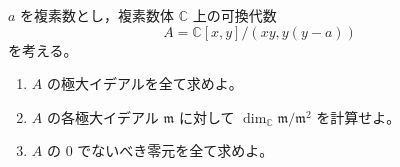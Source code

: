 \newcommand{\C}{\mathbb{C}}
\newcommand{\R}{\mathbb{R}}
\newcommand{\Z}{\mathbb{Z}}
\newcommand{\Tr}{\operatorname{Tr}}
\newcommand{\Impart}{\operatorname{Im}}
\newcommand{\AF}{\operatorname{AF}}
\newcommand{\AX}{\operatorname{AX}}
\newcommand{\GL}{\operatorname{GL}}


\(a\) を複素数とし，複素数体 \(\C\) 上の可換代数
\[
  A=\C[x,y]/(xy,y(y-a))
\]
を考える。

\begin{enumerate}
  \item \(A\) の極大イデアルを全て求めよ。
  \item \(A\) の各極大イデアル \(\mathfrak m\) に対して \(\dim_{\C}\mathfrak m/\mathfrak m^2\) を計算せよ。
  \item \(A\) の \(0\) でないべき零元を全て求めよ。
\end{enumerate}

%